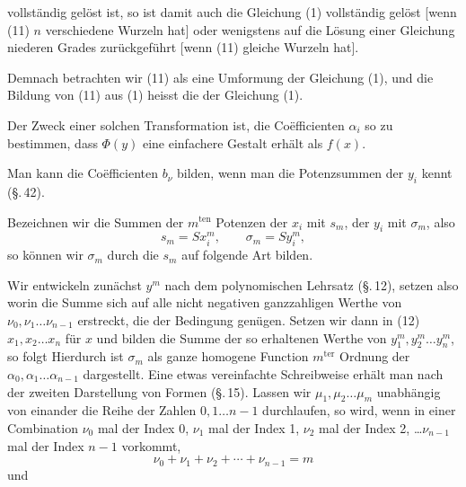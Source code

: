 
vollständig gelöst ist, so ist damit auch die Gleichung (1) vollständig gelöst [wenn (11) $n$ verschiedene Wurzeln hat] oder wenigstens auf die Lösung einer Gleichung niederen Grades zurückgeführt [wenn (11) gleiche Wurzeln hat].

Demnach betrachten wir (11) als eine Umformung der Gleichung (1), und die Bildung von (11) aus (1) heisst die  der Gleichung (1).

Der Zweck einer solchen Transformation ist, die Coëfficienten $\alpha_i$ so zu bestimmen, dass $\Phi(y)$ eine einfachere Gestalt erhält als $f(x)$.

Man kann die Coëfficienten $b_\nu$ bilden, wenn man die Potenzsummen der $y_i$ kennt (\S.\,42).

Bezeichnen wir die Summen der $m^{\text{ten}}$ Potenzen der $x_i$ mit $s_m$, der $y_i$ mit $\sigma_m$, also
\[
s_m = S x_i^m, \qquad \sigma_m = S y_i^m,
\]
so können wir $\sigma_m$ durch die $s_m$ auf folgende Art bilden.

Wir entwickeln zunächst $y^m$ nach dem polynomischen Lehrsatz (\S.\,12), setzen also
worin die Summe sich auf alle nicht negativen ganzzahligen Werthe von $\nu_0, \nu_1 \dots \nu_{n-1}$ erstreckt, die der Bedingung
genügen. Setzen wir dann in (12) $x_1, x_2 \dots x_n$ für $x$ und bilden die Summe der so erhaltenen Werthe von $y_1^m, y_2^m \dots y_n^m$, so folgt
Hierdurch ist $\sigma_m$ als ganze homogene Function $m^{\text{ter}}$ Ordnung der $\alpha_0, \alpha_1 \dots \alpha_{n-1}$ dargestellt. Eine etwas vereinfachte Schreibweise erhält man nach der zweiten Darstellung von Formen (\S.\,15). Lassen wir $\mu_1, \mu_2 \dots \mu_m$ unabhängig von einander die Reihe der Zahlen $0, 1 \dots n-1$ durchlaufen, so wird, wenn in einer Combination $\nu_0$ mal der Index 0, $\nu_1$ mal der Index 1, $\nu_2$ mal der Index 2, \dots $\nu_{n-1}$ mal der Index $n-1$ vorkommt,
\[
\nu_0 + \nu_1 + \nu_2 + \cdots + \nu_{n-1} = m
\]
und
